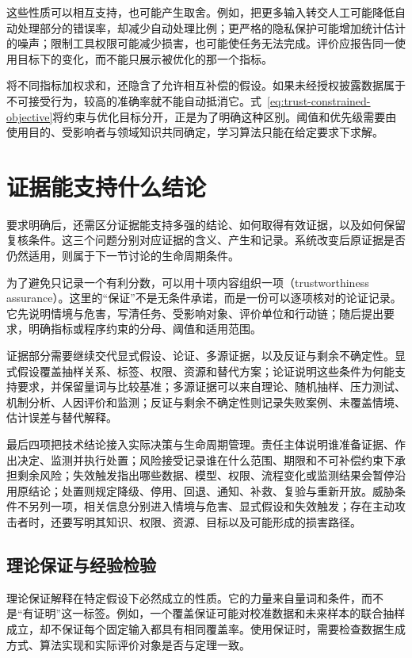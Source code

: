 这些性质可以相互支持，也可能产生取舍。例如，把更多输入转交人工可能降低自动处理部分的错误率，却减少自动处理比例；更严格的隐私保护可能增加统计估计的噪声；限制工具权限可能减少损害，也可能使任务无法完成。评价应报告同一使用目标下的变化，而不能只展示被优化的那一个指标。

将不同指标加权求和，还隐含了允许相互补偿的假设。如果未经授权披露数据属于不可接受行为，较高的准确率就不能自动抵消它。式~\eqref{eq:trust-constrained-objective}将约束与优化目标分开，正是为了明确这种区别。阈值和优先级需要由使用目的、受影响者与领域知识共同确定，学习算法只能在给定要求下求解。

\section{证据能支持什么结论}
\label{sec:trust-evidence}

要求明确后，还需区分证据能支持多强的结论、如何取得有效证据，以及如何保留复核条件。这三个问题分别对应证据的含义、产生和记录。系统改变后原证据是否仍然适用，则属于下一节讨论的生命周期条件。

为了避免只记录一个有利分数，可以用十项内容组织一项（trustworthiness assurance）。这里的“保证”不是无条件承诺，而是一份可以逐项核对的论证记录。它先说明情境与危害，写清任务、受影响对象、评价单位和行动链；随后提出要求，明确指标或程序约束的分母、阈值和适用范围。

证据部分需要继续交代显式假设、论证、多源证据，以及反证与剩余不确定性。显式假设覆盖抽样关系、标签、权限、资源和替代方案；论证说明这些条件为何能支持要求，并保留量词与比较基准；多源证据可以来自理论、随机抽样、压力测试、机制分析、人因评价和监测；反证与剩余不确定性则记录失败案例、未覆盖情境、估计误差与替代解释。

最后四项把技术结论接入实际决策与生命周期管理。责任主体说明谁准备证据、作出决定、监测并执行处置；风险接受记录谁在什么范围、期限和不可补偿约束下承担剩余风险；失效触发指出哪些数据、模型、权限、流程变化或监测结果会暂停沿用原结论；处置则规定降级、停用、回退、通知、补救、复验与重新开放。威胁条件不另列一项，相关信息分别进入情境与危害、显式假设和失效触发；存在主动攻击者时，还要写明其知识、权限、资源、目标以及可能形成的损害路径。

\subsection{理论保证与经验检验}

理论保证解释在特定假设下必然成立的性质。它的力量来自量词和条件，而不是“有证明”这一标签。例如，一个覆盖保证可能对校准数据和未来样本的联合抽样成立，却不保证每个固定输入都具有相同覆盖率。使用保证时，需要检查数据生成方式、算法实现和实际评价对象是否与定理一致。

